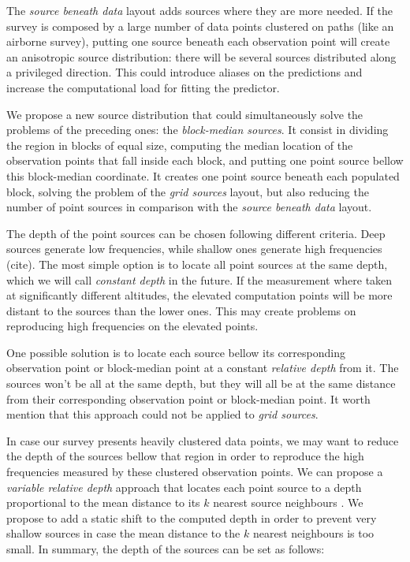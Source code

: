 \documentclass[twocolumn]{article}
\begin{document}
The \emph{source beneath data} layout adds sources where they are more needed.
If the survey is composed by a large number of data points clustered on paths
(like an airborne survey), putting one source beneath each observation point will create
an anisotropic source distribution: there will be several sources distributed along
a privileged direction.
This could introduce aliases on the predictions and increase the computational load for
fitting the predictor.

We propose a new source distribution that could simultaneously solve the problems of the
preceding ones: the \emph{block-median sources}.
It consist in dividing the region in blocks of equal size, computing the median location
of the observation points that fall inside each block, and putting one point source
bellow this block-median coordinate.
It creates one point source beneath each populated block, solving the problem of the
\emph{grid sources} layout, but also reducing the number of point sources in comparison
with the \emph{source beneath data} layout.

The depth of the point sources can be chosen following different criteria.
Deep sources generate low frequencies, while shallow ones generate high frequencies
(cite).
The most simple option is to locate all point sources at the same depth, which we will
call \emph{constant depth} in the future.
If the measurement where taken at significantly different altitudes, the elevated
computation points will be more distant to the sources than the lower ones.
This may create problems on reproducing high frequencies on the elevated points.

One possible solution is to locate each source bellow its corresponding observation
point or block-median point at a constant \emph{relative depth} from it.
The sources won't be all at the same depth, but they will all be at the same distance
from their corresponding observation point or block-median point.
It worth mention that this approach could not be applied to \emph{grid sources}.

In case our survey presents heavily clustered data points, we may want to reduce the
depth of the sources bellow that region in order to reproduce the high frequencies
measured by these clustered observation points.
We can propose a \emph{variable relative depth} approach that locates each point source
to a depth proportional to the mean distance to its $k$ nearest source neighbours
\citep{cordell1992, guspi2004, guspi2009}.
We propose to add a static shift to the computed depth in order to prevent very shallow
sources in case the mean distance to the $k$ nearest neighbours is too small.
In summary, the depth of the sources can be set as follows:
\end{document}

